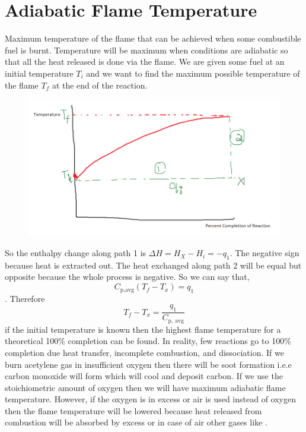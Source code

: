 \documentclass[12pt]{article}
\begin{document}
\section{Adiabatic Flame Temperature}
Maximum temperature of the flame that can be achieved when some combustible fuel is burnt. Temperature will be maximum when conditions are adiabatic so that all the heat released is done via the flame. We are given some fuel at an initial temperature $ T_{i} $ and we want to find the maximum possible temperature of the flame $ T_{f} $ at the end of the reaction.
\begin{figure}
	\includegraphics[scale=0.6]{adiabaticflame.png}
	\centering
\end{figure}
So the enthalpy change along path 1 is $\Delta H=H_X-H_i=-q_1$. The negative sign because heat is extracted out. The heat exchanged along path 2 will be equal but opposite because the whole process is negative. So we can say that, $$C_{\text{p,avg}}(T_f-T_x)=q_1 $$. Therefore 
\begin{equation}
	T_f-T_x=\dfrac{q_1}{C_{\text{p, avg}}} \label{45}
\end{equation}
if the initial temperature is known then the highest flame temperature for a theoretical 100\% completion can be found. In reality, few reactions go to 100\% completion due heat transfer, incomplete combustion, and dissociation. If we burn acetylene gas in insufficient oxygen then there will be soot formation i.e.e carbon monoxide will form which will cool and deposit carbon. If we use the stoichiometric amount of oxygen then we will have maximum adiabatic flame temperature. However, if the oxygen is in excess or air is used instead of oxygen then the flame temperature will be lowered because heat released from combustion will be absorbed by excess  or in case of air other gases like . \\
\end{document}
